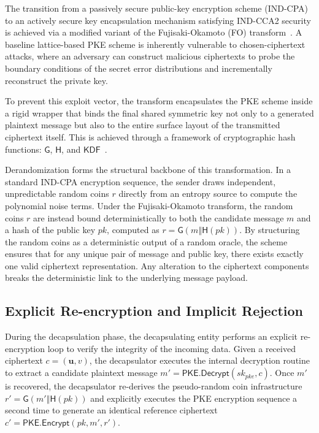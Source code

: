 The transition from a passively secure public-key encryption scheme (IND-CPA) to an actively secure key encapsulation mechanism satisfying IND-CCA2 security is achieved via a modified variant of the Fujisaki-Okamoto (FO) transform~\cite{HHK17}. A baseline lattice-based PKE scheme is inherently vulnerable to chosen-ciphertext attacks, where an adversary can construct malicious ciphertexts to probe the boundary conditions of the secret error distributions and incrementally reconstruct the private key.

To prevent this exploit vector, the transform encapsulates the PKE scheme inside a rigid wrapper that binds the final shared symmetric key not only to a generated plaintext message but also to the entire surface layout of the transmitted ciphertext itself. This is achieved through a framework of cryptographic hash functions: $\mathsf{G}$, $\mathsf{H}$, and $\mathsf{KDF}$~\cite{kyber_spec_2021}.

Derandomization forms the structural backbone of this transformation. In a standard IND-CPA encryption sequence, the sender draws independent, unpredictable random coins $r$ directly from an entropy source to compute the polynomial noise terms. Under the Fujisaki-Okamoto transform, the random coins $r$ are instead bound deterministically to both the candidate message $m$ and a hash of the public key $pk$, computed as $r = \mathsf{G}(m \mathbin{\Vert} \mathsf{H}(pk))$. By structuring the random coins as a deterministic output of a random oracle, the scheme ensures that for any unique pair of message and public key, there exists exactly one valid ciphertext representation. Any alteration to the ciphertext components breaks the deterministic link to the underlying message payload.

\subsection{Explicit Re-encryption and Implicit Rejection}
\label{sub:explicit_reencryption_errors}

During the decapsulation phase, the decapsulating entity performs an explicit re-encryption loop to verify the integrity of the incoming data. Given a received ciphertext $c = (\mathbf{u}, v)$, the decapsulator executes the internal decryption routine to extract a candidate plaintext message $m' = \mathsf{PKE.Decrypt}(sk_{pke}, c)$. Once $m'$ is recovered, the decapsulator re-derives the pseudo-random coin infrastructure $r' = \mathsf{G}(m' \mathbin{\Vert} \mathsf{H}(pk))$ and explicitly executes the PKE encryption sequence a second time to generate an identical reference ciphertext $c' = \mathsf{PKE.Encrypt}(pk, m', r')$.

